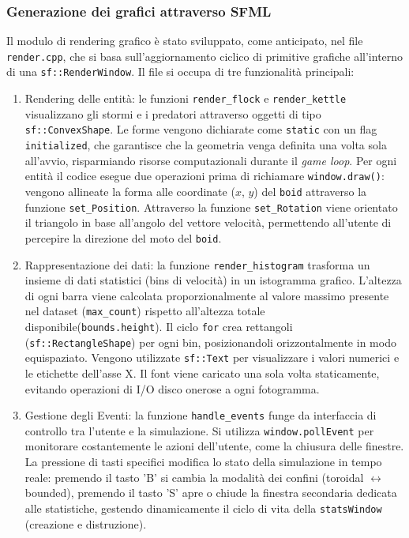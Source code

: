 \documentclass[11pt, a4paper]{article}
\begin{document}
\subsubsection{Generazione dei grafici attraverso SFML}
Il modulo di rendering grafico è stato sviluppato, come anticipato, nel file \texttt{render.cpp}, che si basa sull'aggiornamento ciclico di primitive grafiche all'interno di una \texttt{sf::RenderWindow}. Il file si occupa di tre funzionalità principali:
\begin{enumerate}
    \item Rendering delle entità: le funzioni \texttt{render\_flock} e \texttt{render\_kettle} visualizzano gli stormi e i predatori attraverso oggetti di tipo \texttt{sf::ConvexShape}. Le forme vengono dichiarate come \texttt{static} con un flag \texttt{initialized}, che garantisce che la geometria venga definita una volta sola all'avvio, risparmiando risorse computazionali durante il \textit{game loop}. Per ogni entità il codice esegue due operazioni prima di richiamare \texttt{window.draw()}: vengono allineate la forma alle coordinate ($x$, $y$) del \texttt{boid} attraverso la funzione \texttt{set\_Position}. Attraverso la funzione \texttt{set\_Rotation} viene orientato il triangolo in base all'angolo del vettore velocità, permettendo all'utente di percepire la direzione del moto del \texttt{boid}.
    \item Rappresentazione dei dati: la funzione \texttt{render\_histogram} trasforma un insieme di dati statistici (bins di velocità) in un istogramma grafico. L'altezza di ogni barra viene calcolata proporzionalmente al valore massimo presente nel dataset (\texttt{max\_count}) rispetto all'altezza totale disponibile(\texttt{bounds.height}). Il ciclo \texttt{for} crea rettangoli (\texttt{sf::RectangleShape}) per ogni bin, posizionandoli orizzontalmente in modo equispaziato. Vengono utilizzate \texttt{sf::Text} per visualizzare i valori numerici e le etichette dell'asse X. Il font viene caricato una sola volta staticamente, evitando operazioni di I/O disco onerose a ogni fotogramma.
    \item Gestione degli Eventi: la funzione \texttt{handle\_events} funge da interfaccia di controllo tra l'utente e la simulazione. Si utilizza \texttt{window.pollEvent} per monitorare costantemente le azioni dell'utente, come la chiusura delle finestre. La pressione di tasti specifici modifica lo stato della simulazione in tempo reale: premendo il tasto 'B' si cambia la modalità dei confini (toroidal $\leftrightarrow$ bounded), premendo il tasto 'S' apre o chiude la finestra secondaria dedicata alle statistiche, gestendo dinamicamente il ciclo di vita della \texttt{statsWindow} (creazione e distruzione).
\end{enumerate}
\end{document}
